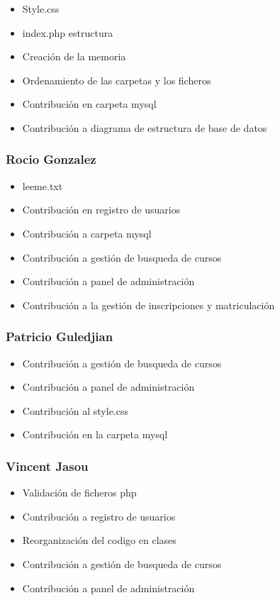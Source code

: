 \documentclass[
]{article}
\providecommand{\tightlist}{%
  \setlength{\itemsep}{0pt}\setlength{\parskip}{0pt}}
\begin{document}
\begin{itemize}
\tightlist
\item
  Style.css
\item
  index.php estructura
\item
  Creación de la memoria
\item
  Ordenamiento de las carpetas y los ficheros
\item
  Contribución en carpeta mysql
\item
  Contribución a diagrama de estructura de base de datos
\end{itemize}

\subsubsection{Rocio Gonzalez}\label{rocio-gonzalez}

\begin{itemize}
\tightlist
\item
  leeme.txt
\item
  Contribución en registro de usuarios
\item
  Contribución a carpeta mysql
\item
  Contribución a gestión de busqueda de cursos
\item
  Contribución a panel de administración
\item
  Contribución a la gestión de inscripciones y matriculación
\end{itemize}

\subsubsection{Patricio Guledjian}\label{patricio-guledjian}

\begin{itemize}
\tightlist
\item
  Contribución a gestión de busqueda de cursos
\item
  Contribución a panel de administración
\item
  Contribución al style.css
\item
  Contribución en la carpeta mysql
\end{itemize}

\subsubsection{Vincent Jasou}\label{vincent-jasou}

\begin{itemize}
\tightlist
\item
  Validación de ficheros php
\item
  Contribución a registro de usuarios
\item
  Reorganización del codigo en clases
\item
  Contribución a gestión de busqueda de cursos
\item
  Contribución a panel de administración
\end{itemize}
\end{document}
